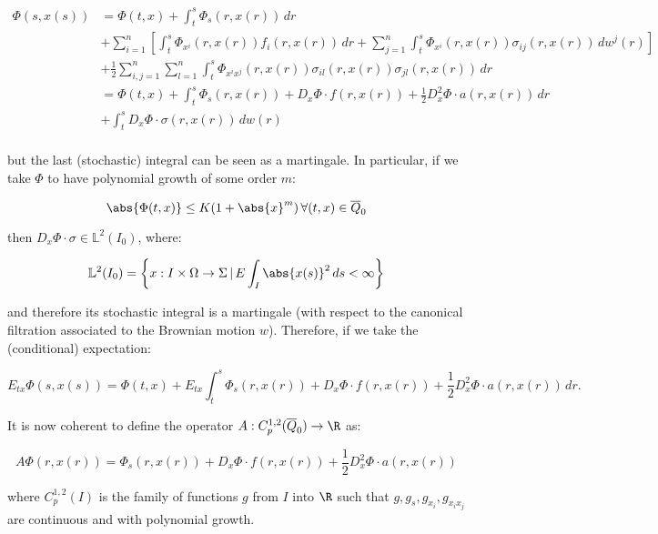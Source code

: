 \begin{align}
    \Phi(s,x(s)) & = \Phi(t,x) + \int_t^s\Phi_s(r,x(r))\,dr \\
    & + \sum_{i=1}^n \left[\int_t^s \Phi_{x^i}(r,x(r))f_i(r,x(r))\,dr + \sum_{j=1}^n\int_t^s\Phi_{x^i}(r,x(r))\sigma_{ij}(r,x(r))\,dw^j(r)\right] \\
    & + \frac{1}{2}\sum_{i,j=1}^n \sum_{l=1}^n\int_t^s\Phi_{x^ix^j}(r,x(r))\sigma_{il}(r,x(r))\sigma_{jl}(r,x(r))\,dr \\
    & = \Phi(t,x) + \int_t^s \Phi_s(r,x(r)) + D_x\Phi\cdot f(r,x(r)) + \frac{1}{2}D^2_x\Phi\cdot a(r,x(r)) \,dr \\
    & + \int_t^s D_x\Phi\cdot\sigma(r,x(r)) \,dw(r) \\
\end{align}

but the last (stochastic) integral can be seen as a martingale. In particular, if we take $\Phi$ to have polynomial growth of some order $m$:

\begin{equation}
    \abs{\Phi(t,x)} \leq K(1+\abs{x}^m)\,\forall(t,x)\in\overline{Q}_0
\end{equation}

then $D_x\Phi\cdot\sigma\in\mathbb{L}^2(I_0)$, where:

\[\mathbb{L}^2(I_0) = \left\{x:I\times\Omega\rightarrow\Sigma\,|\,E\int_I\abs{x(s)}^2\,ds<\infty\right\}\]

and therefore its stochastic integral is a martingale (with respect to the canonical filtration associated to the Brownian motion $w$). 
Therefore, if we take the (conditional) expectation:

\begin{equation}
    E_{tx}\Phi(s,x(s)) = \Phi(t,x) + E_{tx}\int_t^s \Phi_s(r,x(r)) + D_x\Phi\cdot f(r,x(r)) + \frac{1}{2}D^2_x\Phi\cdot a(r,x(r))\,dr.
\end{equation}

It is now coherent to define the operator $A:C_p^{1,2}(\overline{Q}_0)\rightarrow\R$ as:

\begin{equation}\label{2-1-newdefA}
    A\Phi(r,x(r)) = \Phi_s(r,x(r)) + D_x\Phi\cdot f(r,x(r)) + \frac{1}{2}D^2_x\Phi\cdot a(r,x(r))
\end{equation}

where $C_p^{1,2}(I)$ is the family of functions $g$ from $I$ into $\R$ such that $g,g_s,g_{x_i},g_{x_ix_j}$ are continuous and with polynomial growth.

